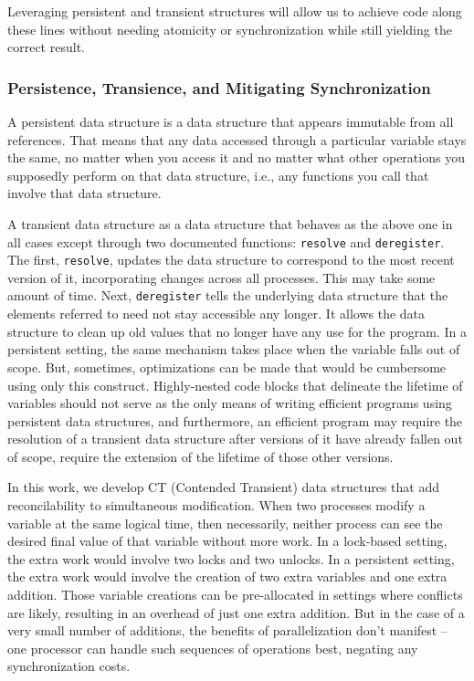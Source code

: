 \documentclass[pageno]{jpaper}
\begin{document}
Leveraging persistent and transient structures will allow us to achieve code
along these lines without needing atomicity or synchronization while still
yielding the correct result.

\subsubsection{Persistence, Transience, and Mitigating Synchronization}
A persistent data structure is a data structure that appears immutable from all
references. That means that any data accessed through a particular variable
stays the same, no matter when you access it and no matter what other
operations you supposedly perform on that data structure, i.e., any functions
you call that involve that data structure. 

A transient data structure as a data structure that behaves as the above
one in all cases except through two documented functions: \texttt{resolve} and
\texttt{deregister}. The first, \texttt{resolve}, updates the data structure to
correspond to the most recent version of it, incorporating changes across all
processes. This may take some amount of time. Next,
\texttt{deregister} tells the underlying data structure that the elements
referred to need not stay accessible any longer. It allows the data structure to
clean up old values that no longer have any use for the program. In a persistent
setting, the same mechanism takes place when the variable falls out of scope.
But, sometimes, optimizations can be made that would be cumbersome using only
this construct. Highly-nested code blocks that delineate the lifetime of
variables should not serve as the only means of writing efficient programs using
persistent data structures, and furthermore, an efficient program may require
the resolution of a transient data structure after versions of it have already
fallen out of scope, require the extension of the lifetime of those other
versions.

In this work, we develop CT (Contended Transient) data structures that add
reconcilability to simultaneous modification. When two processes modify a
variable at the same logical time, then necessarily, neither process can see the
desired final value of that variable without more work. In a lock-based setting,
the extra work would involve two locks and two unlocks. In a persistent setting,
the extra work would involve the creation of two extra variables and one extra
addition. Those variable creations can be pre-allocated in settings where
conflicts are likely, resulting in an overhead of just one extra addition. But
in the case of a very small number of additions, the benefits of parallelization
don't manifest -- one processor can handle such sequences of operations best,
negating any synchronization costs.
\end{document}

